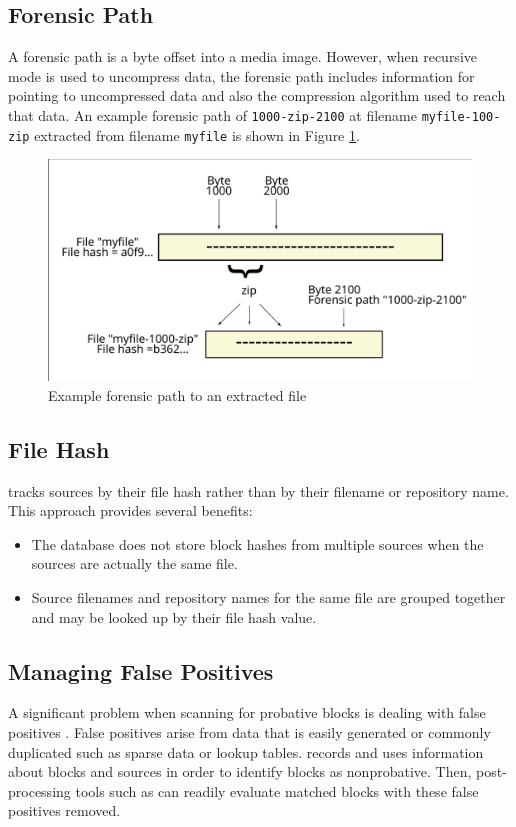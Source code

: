 \documentclass[11pt,fleqn]{article} %
\begin{document}
\subsection{Forensic Path}
A forensic path is a byte offset into a media image. However, when recursive mode is used to uncompress data, the forensic path includes information for pointing to uncompressed data and also the compression algorithm used to reach that data. An example forensic path of \texttt{1000-zip-2100} at filename \texttt{myfile-100-zip} extracted from filename \texttt{myfile} is shown in Figure \ref{fig:forensicPath}.\\

\begin{figure}
	\center
	\includegraphics[scale=.45]{drawings/forensic_path}
	\caption{Example forensic path to an extracted file}
	\label{fig:forensicPath}
\end{figure}

\subsection{File Hash}
\hdb tracks sources by their file hash rather than by their filename
or repository name.  This approach provides several benefits:

\begin{itemize}
\item The database does not store block hashes from multiple sources
when the sources are actually the same file.
\item Source filenames and repository names for the same file are grouped
together and may be looked up by their file hash value.
\end{itemize}

\subsection{Managing False Positives}
A significant problem when scanning for probative blocks is dealing with false positives \cite{hashBasedCarving}. False positives arise from data that is easily generated or commonly duplicated such as sparse data or lookup tables. \hdb records and uses information about blocks and sources in order to identify blocks as nonprobative. Then, post-processing tools such as \sscope can readily evaluate matched blocks with these false positives removed.\\
\end{document}
